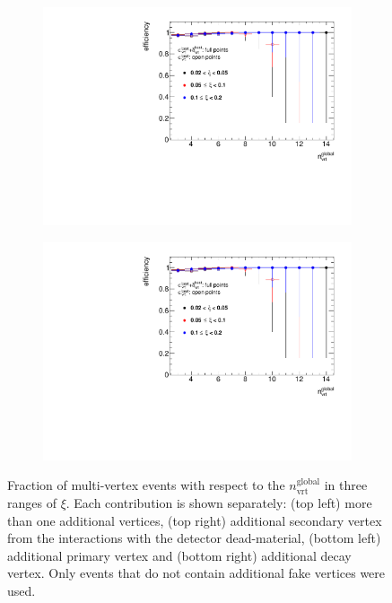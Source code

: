 \begin{figure}[h!]
\begin{subfigure}{.47\textwidth}
		\includegraphics[width=\textwidth,page=6]{chapters/chrgSTAR/img/vertex/vertexEffi_ksi_noFake.pdf}
	\end{subfigure}
	\begin{subfigure}{.47\textwidth}
		\includegraphics[width=\textwidth,page=7]{chapters/chrgSTAR/img/vertex/vertexEffi_ksi_noFake.pdf}
	\end{subfigure}
	\caption{Fraction of multi-vertex events  with respect to the $n_\textrm{vrt}^\textrm{global}$ in three ranges of $\xi$. Each contribution is shown separately: (top left) more than one additional vertices, (top right) additional secondary vertex from the interactions with the detector dead-material, (bottom left) additional primary vertex and (bottom right)  additional decay vertex. Only events that do not contain additional fake vertices were used.}
		\label{fig:vertexVeto_noFake}
\end{figure}

\FloatBarrier
